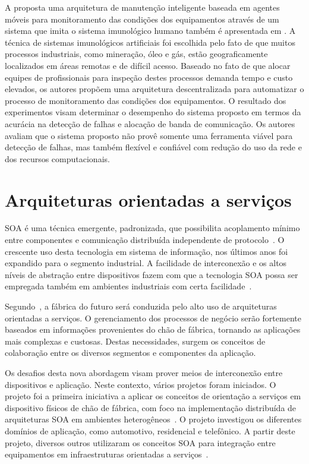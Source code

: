 A proposta uma arquitetura de manutenção inteligente baseada em agentes móveis para monitoramento
das condições dos equipamentos através de um sistema que imita o sistema imunológico humano também é
apresentada em \cite{hua2013mobile}. A técnica de sistemas imunológicos artificiais foi escolhida
pelo fato de que muitos processos industriais, como mineração, óleo e gás, estão geograficamente
localizados em áreas remotas e de difícil acesso. Baseado no fato de que alocar equipes de
profissionais para inspeção destes processos demanda tempo e custo elevados, os autores propõem uma
arquitetura descentralizada para automatizar o processo de monitoramento das condições dos
equipamentos. O resultado dos experimentos visam determinar o desempenho do sistema proposto em
termos da acurácia na detecção de falhas e alocação de banda de comunicação. Os autores avaliam que
o sistema proposto não provê somente uma ferramenta viável para detecção de falhas, mas também
flexível e confiável com redução do uso da rede e dos recursos computacionais.


\section{Arquiteturas orientadas a serviços}

\Gls{SOA} é uma técnica emergente, padronizada, que possibilita acoplamento mínimo entre componentes
e comunicação distribuída independente de protocolo~\cite{papazoglou2007service}. O crescente uso
desta tecnologia em sistema de informação, nos últimos anos foi expandido para o segmento
industrial. A facilidade de interconexão e os altos níveis de abstração entre dispositivos fazem com
que a tecnologia \gls{SOA} possa ser empregada também em ambientes industriais com certa
facilidade~\cite{moritz2008web}.

Segundo~\cite{cannata2010dynamic}, a fábrica do futuro será conduzida pelo alto uso de arquiteturas
orientadas a serviços. O gerenciamento dos processos de negócio serão fortemente baseados em
informações provenientes do chão de fábrica, tornando as aplicações mais complexas e custosas.
Destas necessidades, surgem os conceitos de colaboração entre os diversos segmentos e componentes da
aplicação.

Os desafios desta nova abordagem visam prover meios de interconexão entre dispositivos e aplicação.
Neste contexto, vários projetos foram iniciados. O projeto
 foi a primeira iniciativa a aplicar os conceitos de
orientação a serviços em dispositivo físicos de chão de fábrica, com foco na implementação
distribuída de arquiteturas \gls{SOA} em ambientes heterogêneos~\cite{jammes2005service}. O projeto
investigou os diferentes domínios de aplicação, como automotivo, residencial e telefônico. A partir
deste projeto, diversos outros utilizaram os conceitos \gls{SOA} para integração entre equipamentos
em infraestruturas orientadas a serviços~\cite{zeeb2007service}.

